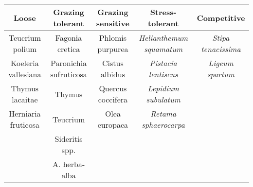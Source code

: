 \documentclass[12pt]{article} %
\begin{document}
\begin{landscape}

\begin{center}
\begin{tabular}{ccccc}
\hline 
Loose & Grazing tolerant & Grazing sensitive & Stress-tolerant & Competitive \\ 
\hline 
Teucrium polium & Fagonia cretica & Phlomis purpurea & \textit{Helianthemum squamatum} & \textit{Stipa tenacissima} \\ 

Koeleria vallesiana & Paronichia sufruticosa & Cistus albidus & \textit{Pistacia lentiscus} & \textit{Ligeum spartum} \\ 

Thymus lacaitae & Thymus & Quercus coccifera  & \textit{Lepidium subulatum} &  \\ 

Herniaria fruticosa & Teucrium & Olea europaea & \textit{Retama sphaerocarpa} &  \\ 

 & Sideritis spp. &  &  &  \\ 

 & A. herba-alba &  &  &  \\ 
\hline
\end{tabular} 
\end{center}
\end{landscape}
\end{document}
